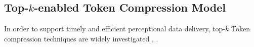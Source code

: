 \documentclass[lettersize,journal]{IEEEtran}
\theoremstyle{custom}
\begin{document}

\subsection{Top-$k$-enabled Token Compression Model}
In order to support timely and efficient perceptional data delivery, top-$k$ Token compression techniques are widely investigated \cite{}, \cite{}. 
\end{document}
